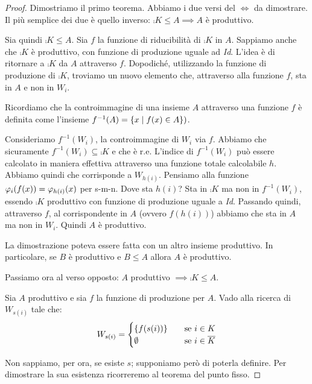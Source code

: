 \begin{proof}
    Dimostriamo il primo teorema. Abbiamo i due versi del $\iff$ da dimostrare. Il più semplice dei due è
    quello inverso: $\comp{K} \leq A \implies A$ è produttivo.

    Sia quindi $\comp{K} \leq A$. Sia $f$ la funzione di riducibilità di $\comp{K}$ in $A$. Sappiamo anche che
    $\comp{K}$ è produttivo, con funzione di produzione uguale ad \textit{Id}. L'idea è di ritornare a
    $\comp{K}$ da $A$ attraverso $f$. Dopodiché, utilizzando la funzione di produzione di
    $\comp{K}$,
    troviamo un nuovo elemento che, attraverso alla funzione $f$, sta in $A$ e non in $W_{i}$.

    Ricordiamo che la controimmagine di una insieme $A$ attraverso una funzione $f$ è definita come
    l'insieme $f^{-1}(A) = \{x \mid f(x) \in A\})$.

    Consideriamo $f^{-1}(W_{i})$, la controimmagine di $W_{i}$ via $f$. Abbiamo che sicuramente
    $f^{-1}(W_{i}) \subseteq \comp{K}$ e che è r.e. L'indice di $f^{-1}(W_{i})$ può essere calcolato
    in maniera effettiva attraverso una funzione totale calcolabile $h$.  Abbiamo quindi che
    corrisponde a $W_{h(i)}$. Pensiamo alla funzione $\varphi_{i}(f(x)) = \varphi_{h(i)}(x)$ per s-m-n. Dove
    sta $h(i)$?  Sta in $\comp{K}$ ma non in $f^{-1}(W_{i})$, essendo $\comp{K}$ produttivo con
    funzione di produzione uguale a \textit{Id}. Passando quindi, attraverso $f$, al corrispondente
    in $A$ (ovvero $f(h(i))$) abbiamo che sta in $A$ ma non in $W_{i}$. Quindi $A$ è produttivo.

    La dimostrazione poteva essere fatta con un altro insieme produttivo. In particolare, se $B$ è
    produttivo e $B \leq A$ allora $A$ è produttivo.

    Passiamo ora al verso opposto: $A$ produttivo $\implies \comp{K} \leq A$.

    Sia $A$ produttivo e sia $f$ la funzione di produzione per $A$. Vado alla ricerca di $W_{s(i)}$
    tale che:
    \begin{equation*}
        W_{s(i)} =
        \begin{cases}
            \{f(s(i))\} \quad &\text{se $i \in K$} \\
            \emptyset \quad &\text{se $i \in \overline{K}$}
        \end{cases}
    \end{equation*}

    Non sappiamo, per ora, se esiste $s$; supponiamo però di poterla definire. Per dimostrare la
    sua esistenza ricorreremo al teorema del punto fisso.


\end{proof}
